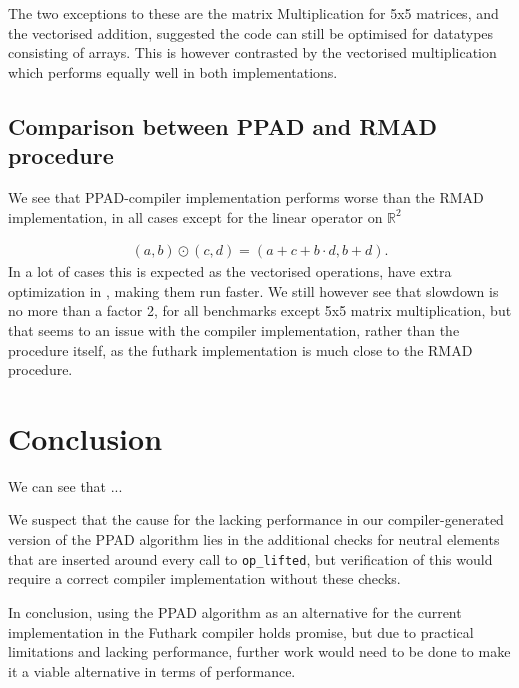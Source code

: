 \documentclass{article}
\begin{document}
The two exceptions to these are the matrix Multiplication for 5x5 matrices,
and the vectorised addition,
suggested the code can still be optimised for datatypes consisting of
arrays.
This is however contrasted by the vectorised multiplication which performs
equally well in both implementations.

\subsection{Comparison between PPAD and RMAD procedure}
We see that PPAD-compiler implementation performs worse than the RMAD
implementation, in all cases except for the linear operator on \(\mathbb{R}^{2}\)

\begin{align*}
	(a,b) \odot (c,d) = (a + c + b \cdot d, b + d).
\end{align*}
In a lot of cases this is expected as the vectorised operations, have extra
optimization in \cite{Futhark}, making them run faster.
We still however see that slowdown is no more than a factor 2, for all
benchmarks except 5x5 matrix multiplication, but that seems to an issue with
the compiler implementation, rather than the procedure itself, as the
futhark implementation is much close to the RMAD procedure.
\section{Conclusion}
We can see that ...

We suspect that the cause for the lacking performance in our compiler-generated version of the PPAD
algorithm lies in the additional checks for neutral elements that are inserted around
every call to \lstinline{op_lifted}, but verification of this would require a correct
compiler implementation without these checks.

In conclusion, using the PPAD algorithm as an alternative for the current implementation in the
Futhark compiler holds promise, but due to practical limitations and lacking performance, further
work would need to be done to make it a viable alternative in terms of performance.
\printbibliography
\end{document}

